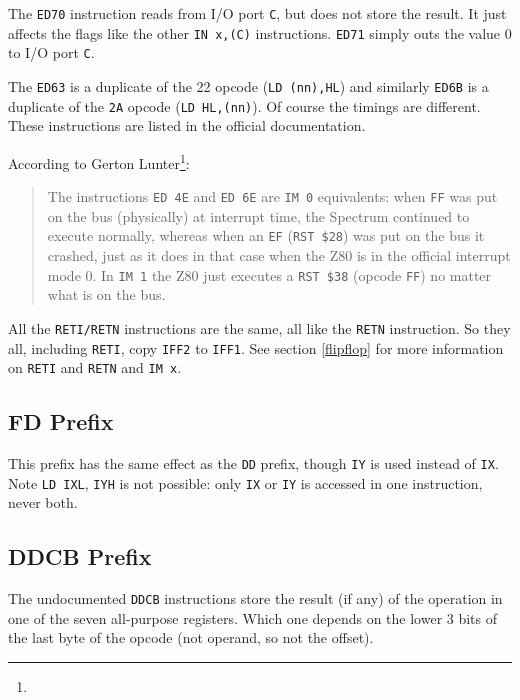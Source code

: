 The {\tt ED70} instruction reads from I/O port {\tt C}, but does not store the result. It just affects the flags like the other {\tt IN x,(C)} instructions. {\tt ED71} simply outs the value 0 to I/O port {\tt C}.

The {\tt ED63} is a duplicate of the 22 opcode ({\tt LD (nn),HL}) and similarly {\tt ED6B} is a duplicate of the {\tt 2A} opcode ({\tt LD HL,(nn)}). Of course the timings are different. These instructions are listed in the official documentation.

\pagebreak
According to Gerton Lunter\footnote{}:

\begin{quote}
	The instructions {\tt ED 4E} and {\tt ED 6E} are {\tt IM 0} equivalents: when {\tt FF} was put on the bus (physically) at interrupt time, the Spectrum continued to execute normally, whereas when an {\tt EF} ({\tt RST \$28}) was put on the bus it crashed, just as it does in that case when the Z80 is in the official interrupt mode 0. In {\tt IM 1} the Z80 just executes a {\tt RST \$38} (opcode {\tt FF}) no matter what is on the bus.
\end{quote}

All the {\tt RETI/RETN} instructions are the same, all like the {\tt RETN} instruction. So they all, including {\tt RETI}, copy {\tt IFF2} to {\tt IFF1}. See section \ref{flipflop} for more information on {\tt RETI} and {\tt RETN} and {\tt IM x}.


\subsection{FD Prefix \cite{gerton}}

This prefix has the same effect as the {\tt DD} prefix, though {\tt IY} is used instead of {\tt IX}.  Note {\tt LD IXL}, {\tt IYH} is not possible: only {\tt IX} or {\tt IY} is accessed in one instruction, never both.


\subsection{DDCB Prefix}
\label{prefix_cbdd}

The undocumented {\tt DDCB} instructions store the result (if any) of the operation in one of the seven all-purpose registers. Which one depends on the lower 3 bits of the last byte of the opcode (not operand, so not the offset).


